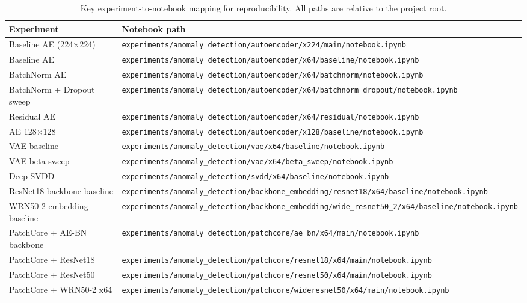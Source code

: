 \documentclass[11pt]{article}
\begin{document}
\begin{table}[H]
\centering
\caption{Key experiment-to-notebook mapping for reproducibility.
All paths are relative to the project root.}
\label{tab:appendix_notebooks}
\begin{tabularx}{\linewidth}{>{\raggedright\arraybackslash}X>{\raggedright\arraybackslash}X}
\toprule
Experiment & Notebook path \\
\midrule
Baseline AE (224$\times$224)
  & \texttt{experiments/anomaly\_detection/autoencoder/x224/main/notebook.ipynb} \\
Baseline AE
  & \texttt{experiments/anomaly\_detection/autoencoder/x64/baseline/notebook.ipynb} \\
BatchNorm AE
  & \texttt{experiments/anomaly\_detection/autoencoder/x64/batchnorm/notebook.ipynb} \\
BatchNorm + Dropout sweep
  & \texttt{experiments/anomaly\_detection/autoencoder/x64/batchnorm\_dropout/notebook.ipynb} \\
Residual AE
  & \texttt{experiments/anomaly\_detection/autoencoder/x64/residual/notebook.ipynb} \\
AE 128$\times$128
  & \texttt{experiments/anomaly\_detection/autoencoder/x128/baseline/notebook.ipynb} \\
VAE baseline
  & \texttt{experiments/anomaly\_detection/vae/x64/baseline/notebook.ipynb} \\
VAE beta sweep
  & \texttt{experiments/anomaly\_detection/vae/x64/beta\_sweep/notebook.ipynb} \\
Deep SVDD
  & \texttt{experiments/anomaly\_detection/svdd/x64/baseline/notebook.ipynb} \\
ResNet18 backbone baseline
  & \texttt{experiments/anomaly\_detection/backbone\_embedding/resnet18/x64/baseline/notebook.ipynb} \\
WRN50-2 embedding baseline
  & \texttt{experiments/anomaly\_detection/backbone\_embedding/wide\_resnet50\_2/x64/baseline/notebook.ipynb} \\
PatchCore + AE-BN backbone
  & \texttt{experiments/anomaly\_detection/patchcore/ae\_bn/x64/main/notebook.ipynb} \\
PatchCore + ResNet18
  & \texttt{experiments/anomaly\_detection/patchcore/resnet18/x64/main/notebook.ipynb} \\
PatchCore + ResNet50
  & \texttt{experiments/anomaly\_detection/patchcore/resnet50/x64/main/notebook.ipynb} \\
PatchCore + WRN50-2 x64
  & \texttt{experiments/anomaly\_detection/patchcore/wideresnet50/x64/main/notebook.ipynb} \\

\end{tabularx}
\end{table}
\end{document}
